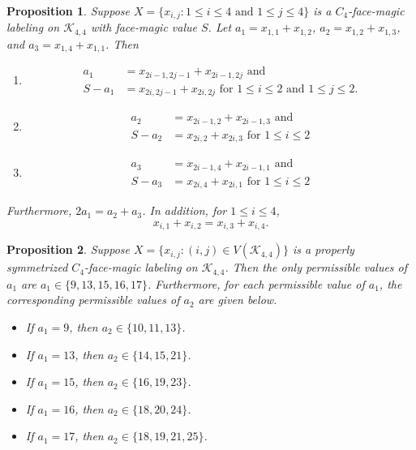 \documentclass[10pt,a4paper]{amsart}
\newtheorem{proposition}{Proposition}
\begin{document}
\begin{proposition}\label{prop:extendedgesums}
Suppose  $X=\{x_{i,j}: 1\le i \le 4 \text{ and } 
   1\le j \le 4\}$ is a $C_4$-face-magic labeling
   on $\mathcal{K}_{4,4}$ with face-magic value $S$.
   Let $a_1= x_{1,1} + x_{1,2}$,
    $a_2= x_{1,2} + x_{1,3}$, and
     $a_3= x_{1,4} + x_{1,1}$.
        Then
\begin{enumerate}
\item[(i)]
\begin{align*}
   a_1 &= x_{2i-1,2j-1} + x_{2i-1,2j} 
    \text{ \ \  and } \\
  S - a_1 &=  x_{2i,2j-1} + x_{2i,2j} 
    \text{ \ \ \ \ \ \ \ \ for } 1\le i \le 2 
    \text{ and } 1 \le j \le 2.
\end{align*}
\item[(ii)]
\begin{align*}
    a_2 & = x_{2i-1, 2} + x_{2i-1, 3}
    \text{ \ \  and } \\
    S - a_2 & = x_{2i, 2} + x_{2i,3}
    \text{ \ \ \ \ \ \ \ \ for } 1\le i \le 2
\end{align*}
\item[(iii)]
\begin{align*}
    a_3 & = x_{2i-1, 4} + x_{2i-1, 1}
    \text{ \ \  and } \\
    S - a_3 & = x_{2i, 4} + x_{2i,1}
    \text{ \ \ \ \ \ \ \ \ for } 1\le i \le 2
\end{align*}
\end{enumerate}
Furthermore, $2a_1 = a_2 + a_3$. In addition, for $1\le i \le 4$,
\begin{equation} \label{eqn:SameEdgeSum}
    x_{i,1} + x_{i,2} = x_{i,3} + x_{i,4}.
\end{equation}
\end{proposition}

\begin{proposition} \label{prop:PermissibleA1Values}
     Suppose $X=\{ x_{i,j} : (i,j) \in V(\mathcal{K}_{4,4})\}$ 
  is a properly symmetrized $C_4$-face-magic labeling on $\mathcal{K}_{4,4}$.
  Then the only permissible values of $a_1$ 
  are $a_1\in\{9,13,15,16,17\}$.
  Furthermore, for each permissible value of $a_1$,
  the corresponding permissible values of $a_2$ are given below.
  \begin{itemize}
    \item If $a_1=9$, then $a_2\in\{10,11,13\}$.
    \item If $a_1=13$, then $a_2\in\{14,15,21\}$.
    \item If $a_1=15$, then $a_2\in\{16,19,23\}$.
    \item If $a_1=16$, then $a_2\in\{18,20,24\}$.
    \item If $a_1=17$, then $a_2\in\{18,19,21,25\}$.
  \end{itemize}
\end{proposition}
\end{document}
